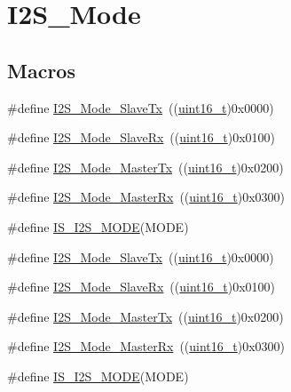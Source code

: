\hypertarget{group___i2_s___mode}{}\section{I2\+S\+\_\+\+Mode}
\label{group___i2_s___mode}
\subsection*{Macros}
\begin{DoxyCompactItemize}
\item 
\#define \hyperlink{group___i2_s___mode_gadd5b20277198fcdb6aa53ea48e802ae5}{I2\+S\+\_\+\+Mode\+\_\+\+Slave\+Tx}~((\hyperlink{_p_e___types_8h_a1f1825b69244eb3ad2c7165ddc99c956}{uint16\+\_\+t})0x0000)
\item 
\#define \hyperlink{group___i2_s___mode_gaaf62ee0353476afc9612dc2933e1c5c5}{I2\+S\+\_\+\+Mode\+\_\+\+Slave\+Rx}~((\hyperlink{_p_e___types_8h_a1f1825b69244eb3ad2c7165ddc99c956}{uint16\+\_\+t})0x0100)
\item 
\#define \hyperlink{group___i2_s___mode_ga3a62ee8964033a3f6fd030da9e40fba6}{I2\+S\+\_\+\+Mode\+\_\+\+Master\+Tx}~((\hyperlink{_p_e___types_8h_a1f1825b69244eb3ad2c7165ddc99c956}{uint16\+\_\+t})0x0200)
\item 
\#define \hyperlink{group___i2_s___mode_gabf9f872cda7c0f159c5fc18aed44e973}{I2\+S\+\_\+\+Mode\+\_\+\+Master\+Rx}~((\hyperlink{_p_e___types_8h_a1f1825b69244eb3ad2c7165ddc99c956}{uint16\+\_\+t})0x0300)
\item 
\#define \hyperlink{group___i2_s___mode_ga942c37b2c1274c4c5773ddcf8b46d9b5}{I\+S\+\_\+\+I2\+S\+\_\+\+M\+O\+DE}(M\+O\+DE)
\item 
\#define \hyperlink{group___i2_s___mode_gadd5b20277198fcdb6aa53ea48e802ae5}{I2\+S\+\_\+\+Mode\+\_\+\+Slave\+Tx}~((\hyperlink{_p_e___types_8h_a1f1825b69244eb3ad2c7165ddc99c956}{uint16\+\_\+t})0x0000)
\item 
\#define \hyperlink{group___i2_s___mode_gaaf62ee0353476afc9612dc2933e1c5c5}{I2\+S\+\_\+\+Mode\+\_\+\+Slave\+Rx}~((\hyperlink{_p_e___types_8h_a1f1825b69244eb3ad2c7165ddc99c956}{uint16\+\_\+t})0x0100)
\item 
\#define \hyperlink{group___i2_s___mode_ga3a62ee8964033a3f6fd030da9e40fba6}{I2\+S\+\_\+\+Mode\+\_\+\+Master\+Tx}~((\hyperlink{_p_e___types_8h_a1f1825b69244eb3ad2c7165ddc99c956}{uint16\+\_\+t})0x0200)
\item 
\#define \hyperlink{group___i2_s___mode_gabf9f872cda7c0f159c5fc18aed44e973}{I2\+S\+\_\+\+Mode\+\_\+\+Master\+Rx}~((\hyperlink{_p_e___types_8h_a1f1825b69244eb3ad2c7165ddc99c956}{uint16\+\_\+t})0x0300)
\item 
\#define \hyperlink{group___i2_s___mode_ga942c37b2c1274c4c5773ddcf8b46d9b5}{I\+S\+\_\+\+I2\+S\+\_\+\+M\+O\+DE}(M\+O\+DE)
\end{DoxyCompactItemize}


